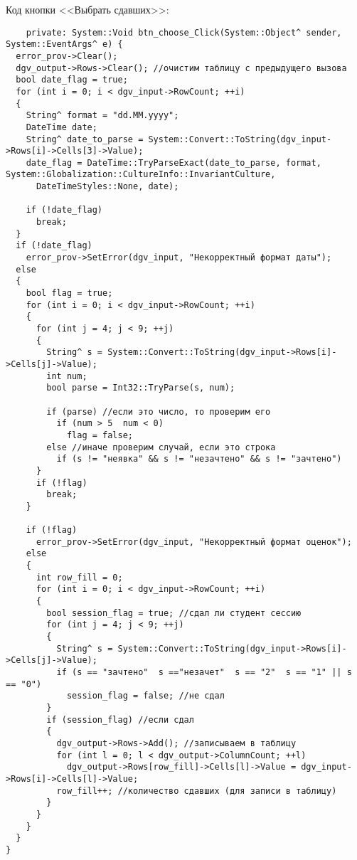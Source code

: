 Код кнопки <<Выбрать сдавших>>:
\begin{verbatim}
    private: System::Void btn_choose_Click(System::Object^ sender, System::EventArgs^ e) {
  error_prov->Clear();
  dgv_output->Rows->Clear(); //очистим таблицу с предыдущего вызова
  bool date_flag = true;
  for (int i = 0; i < dgv_input->RowCount; ++i)
  {
    String^ format = "dd.MM.yyyy";
    DateTime date;
    String^ date_to_parse = System::Convert::ToString(dgv_input->Rows[i]->Cells[3]->Value);
    date_flag = DateTime::TryParseExact(date_to_parse, format, System::Globalization::CultureInfo::InvariantCulture,
      DateTimeStyles::None, date);

    if (!date_flag)
      break;
  }
  if (!date_flag)
    error_prov->SetError(dgv_input, "Некорректный формат даты");
  else
  {
    bool flag = true;
    for (int i = 0; i < dgv_input->RowCount; ++i)
    {
      for (int j = 4; j < 9; ++j)
      {
        String^ s = System::Convert::ToString(dgv_input->Rows[i]->Cells[j]->Value);
        int num;
        bool parse = Int32::TryParse(s, num);

        if (parse) //если это число, то проверим его
          if (num > 5  num < 0)
            flag = false;
        else //иначе проверим случай, если это строка
          if (s != "неявка" && s != "незачтено" && s != "зачтено")
      }
      if (!flag)
        break;
    }

    if (!flag)
      error_prov->SetError(dgv_input, "Некорректный формат оценок");
    else
    {
      int row_fill = 0;
      for (int i = 0; i < dgv_input->RowCount; ++i)
      {
        bool session_flag = true; //сдал ли студент сессию
        for (int j = 4; j < 9; ++j)
        {
          String^ s = System::Convert::ToString(dgv_input->Rows[i]->Cells[j]->Value);
          if (s == "зачтено"  s =="незачет"  s == "2"  s == "1" || s == "0")
            session_flag = false; //не сдал
        }
        if (session_flag) //если сдал
        {
          dgv_output->Rows->Add(); //записываем в таблицу
          for (int l = 0; l < dgv_output->ColumnCount; ++l)
            dgv_output->Rows[row_fill]->Cells[l]->Value = dgv_input->Rows[i]->Cells[l]->Value;
          row_fill++; //количество сдавших (для записи в таблицу)
        }
      }
    }
  }
}
\end{verbatim}

